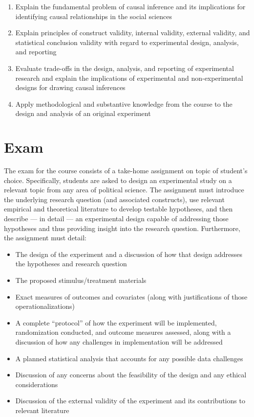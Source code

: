 \documentclass[12pt,a4paper]{article}
\begin{document}
\begin{enumerate}
\item Explain the fundamental problem of causal inference and its implications for identifying causal relationships in the social sciences
\item Explain principles of construct validity, internal validity, external validity, and statistical conclusion validity with regard to experimental design, analysis, and reporting
\item Evaluate trade-offs in the design, analysis, and reporting of experimental research and explain the implications of experimental and non-experimental designs for drawing causal inferences
\item Apply methodological and substantive knowledge from the course to the design and analysis of an original experiment
\end{enumerate}

\section{Exam}
The exam for the course consists of a take-home assignment on topic of student's choice. Specifically, students are asked to design an experimental study on a relevant topic from any area of political science. The assignment must introduce the underlying research question (and associated constructs), use relevant empirical and theoretical literature to develop testable hypotheses, and then describe --- in detail --- an experimental design capable of addressing those hypotheses and thus providing insight into the research question. Furthermore, the assignment must detail:
\begin{itemize}
\item The design of the experiment and a discussion of how that design addresses the hypotheses and research question
\item The proposed stimulus/treatment materials
\item Exact measures of outcomes and covariates (along with justifications of those operationalizations)
\item A complete ``protocol'' of how the experiment will be implemented, randomization conducted, and outcome measures assessed, along with a discussion of how any challenges in implementation will be addressed
\item A planned statistical analysis that accounts for any possible data challenges
\item Discussion of any concerns about the feasibility of the design and any ethical considerations
\item Discussion of the external validity of the experiment and its contributions to relevant literature
\end{itemize}
\end{document}
